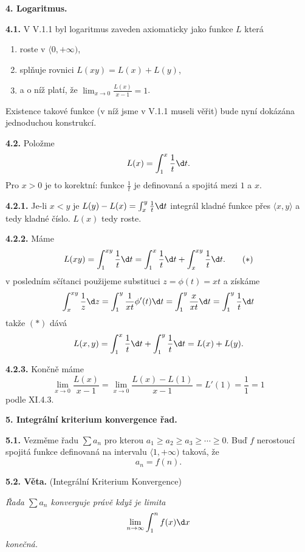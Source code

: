 \documentclass[12pt]{article}
\begin{document}
{\vskip10mm
 
 {\large\bf 4. Logaritmus.} 
 
 \bigskip
 
 {\bf 4.1.} V V.1.1 byl logaritmus zaveden axiomaticky jako funkce $L$ 
 která
 \begin{enumerate}
 \item  roste v $\langle 0,+\infty)$,
 \item splňuje rovnici $L(xy)=L(x)+L(y)$, 
 \item a o níž platí, že $\lim_{x\to 0}\frac{L(x)}{x-1}=1$.
 \end{enumerate}
 Existence takové funkce (v níž jsme v V.1.1 museli věřit) bude nyní dokázána jednoduchou konstrukcí.
 
 \bigskip
 
 {\bf 4.2.} Položme
 $$
 L(x)=\int_1^x \frac1{t}\d t .
 $$
 Pro  $x>0$ je to korektní: funkce $\frac1{t}$ je definovaná a spojitá mezi $1$ a $x$.
  
 \medskip
 
 {\bf 4.2.1.} Je-li $x<y$ je $L(y)-L(x)=\int_x^y \frac1{t}\d t$
integrál kladné funkce přes $\langle x,y\rangle$ a tedy kladné číslo. $L(x)$ tedy roste.
 
 \medskip
 
 {\bf 4.2.2.} Máme
 \begin{equation}
 L(xy)=\int_1^{xy} \frac1{t}\d t=\int_1^x \frac1{t}\d t+\int_x^{xy}\frac1{t}\d t.\tag{$*$}
 \end{equation}
 v posledním sčítanci použijeme substituci $z=\phi(t)=xt$ a získáme
 $$
\int_x^{xy} \frac1{z}\d z=
\int_1^y \frac1{xt}\phi'(t)\d t=
\int_1^y \frac{x}{xt}\d t=\int_1^y \frac1{t}\d t
$$
takže $(*)$ dává
$$
L(x,y)=\int_1^x \frac1{t}\d t+\int_1^y \frac1{t}\d t=L(x)+L(y).
$$

\medskip

{\bf 4.2.3.} Končně máme
$$
\lim_{x\to 0}\frac{L(x)}{x-1}=\lim_{x\to 0}\frac{L(x)-L(1)}{x-1}=
L'(1)=\frac11=1
$$
podle XI.4.3.


\vskip10mm
 
 {\large\bf 5. Integrální kriterium konvergence řad.} 
 
 \bigskip
 
 {\bf 5.1.} Vezměme řadu $\sum a_n$ pro kterou $a_1\geq a_2\geq a_3\geq\cdots \geq 0$. Buď $f$ nerostoucí  spojitá funkce definovaná na intervalu $\langle 1,+\infty)$ taková, že
 $$
       a_n=f(n).
$$

\bigskip

{\bf 5.2. Věta.} (Integrální Kriterium Konvergence) {\em Řada $\sum a_n$ konverguje právě když je limita
$$
\lim_{n\to\infty}\int_1^nf(x)\d x
$$
konečná.

}}
\end{document}
